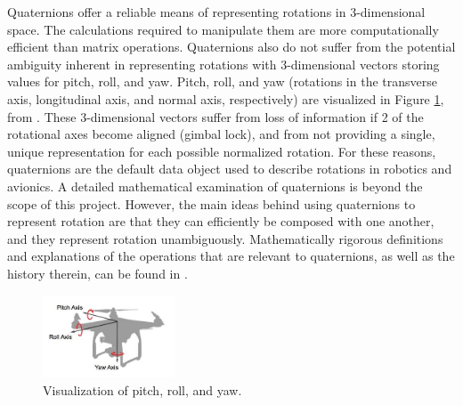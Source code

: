 
Quaternions offer a reliable means of representing rotations in 3-dimensional space. The calculations required to manipulate them are more computationally efficient than matrix operations. Quaternions also do not suffer from the potential ambiguity inherent in representing rotations with 3-dimensional vectors storing values for pitch, roll, and yaw. Pitch, roll, and yaw (rotations in the transverse axis, longitudinal axis, and normal axis, respectively) are visualized in Figure \ref{fig:pitch_roll_yaw}, from \cite{pitch_roll_yaw_dji_source}. These 3-dimensional vectors suffer from loss of information if 2 of the rotational axes become aligned (gimbal lock), and from not providing a single, unique representation for each possible normalized rotation. For these reasons, quaternions are the default data object used to describe rotations in robotics and avionics. A detailed mathematical examination of quaternions is beyond the scope of this project. However, the main ideas behind using quaternions to represent rotation are that they can efficiently be composed with one another, and they represent rotation unambiguously. Mathematically rigorous definitions and explanations of the operations that are relevant to quaternions, as well as the history therein, can be found in \cite{quaternions_reference}.

\begin{figure}
    \centering
    \includegraphics[width=0.35\textwidth]{images/pitch_roll_yaw_dji.png}
    \caption{Visualization of pitch, roll, and yaw.}
    \label{fig:pitch_roll_yaw}
\end{figure}


